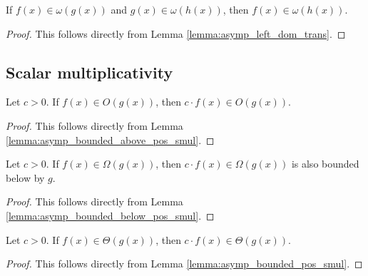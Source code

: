 \begin{lemma}
    \label{lemma:omega_trans}
    \leanok
    If $f(x) \in \omega(g(x))$ and $g(x) \in \omega(h(x))$, then $f(x) \in \omega(h(x))$.
\end{lemma}

\begin{proof}
    \leanok
    This follows directly from Lemma \ref{lemma:asymp_left_dom_trans}.
\end{proof}


\subsection{Scalar multiplicativity}

\begin{lemma}
    \label{lemma:O_pos_smul}
    \leanok
    Let $c > 0$. If $f(x) \in O(g(x))$, then $c \cdot f(x) \in O(g(x))$.
\end{lemma}

\begin{proof}
    \leanok
    This follows directly from Lemma \ref{lemma:asymp_bounded_above_pos_smul}.
\end{proof}

\begin{lemma}
    \label{lemma:Omega_pos_smul}
    \leanok
    Let $c > 0$. If $f(x) \in \Omega(g(x))$, then $c \cdot f(x) \in \Omega(g(x))$ is also bounded
    below by $g$.
\end{lemma}

\begin{proof}
    \leanok
    This follows directly from Lemma \ref{lemma:asymp_bounded_below_pos_smul}.
\end{proof}

\begin{lemma}
    \label{lemma:theta_pos_smul}
    \leanok
    Let $c > 0$. If $f(x) \in \Theta(g(x))$, then $c \cdot f(x) \in \Theta(g(x))$.
\end{lemma}

\begin{proof}
    \leanok
    This follows directly from Lemma \ref{lemma:asymp_bounded_pos_smul}.
\end{proof}


